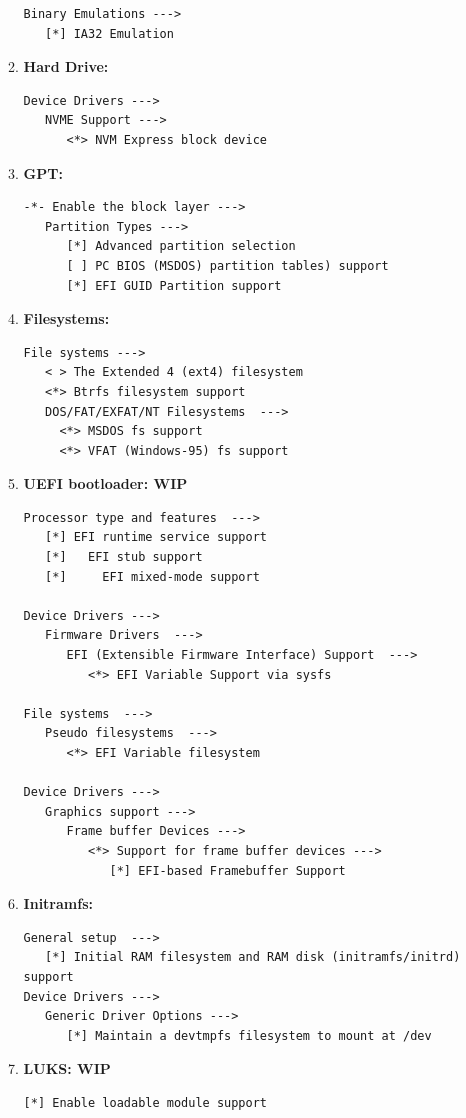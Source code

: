 \documentclass[10pt, a4paper, onecolumn, oneside, titlepage, openany]{book}
\begin{document}
\begin{enumerate}
\begin{enumerate}
\begin{Verbatim}[commandchars=\\\{\}]
Binary Emulations --->
   [*] IA32 Emulation
\end{Verbatim}
        \item \textbf{Hard Drive:}
\begin{Verbatim}[commandchars=\\\{\}]
Device Drivers --->
   NVME Support --->
      <*> NVM Express block device
\end{Verbatim}
    \item \textbf{GPT:}
\begin{Verbatim}[commandchars=\\\{\}]
-*- Enable the block layer --->
   Partition Types --->
      [*] Advanced partition selection
      [ ] PC BIOS (MSDOS) partition tables) support
      [*] EFI GUID Partition support
\end{Verbatim}
        \item \textbf{Filesystems:}
\begin{Verbatim}[commandchars=\\\{\}]
File systems --->
   < > The Extended 4 (ext4) filesystem
   <*> Btrfs filesystem support
   DOS/FAT/EXFAT/NT Filesystems  --->
     <*> MSDOS fs support
     <*> VFAT (Windows-95) fs support
\end{Verbatim}
        \item \textbf{UEFI bootloader: WIP}
\begin{Verbatim}[commandchars=\\\{\}]
Processor type and features  --->
   [*] EFI runtime service support
   [*]   EFI stub support
   [*]     EFI mixed-mode support

Device Drivers --->
   Firmware Drivers  --->
      EFI (Extensible Firmware Interface) Support  --->
         <*> EFI Variable Support via sysfs

File systems  --->
   Pseudo filesystems  --->
      <*> EFI Variable filesystem

Device Drivers --->
   Graphics support --->
      Frame buffer Devices --->
         <*> Support for frame buffer devices --->
            [*] EFI-based Framebuffer Support
\end{Verbatim}
        \item \textbf{Initramfs:}
\begin{Verbatim}[commandchars=\\\{\}]
General setup  --->
   [*] Initial RAM filesystem and RAM disk (initramfs/initrd) support
Device Drivers --->
   Generic Driver Options --->
      [*] Maintain a devtmpfs filesystem to mount at /dev
\end{Verbatim}
        \item \textbf{LUKS: WIP}
\begin{Verbatim}[commandchars=\\\{\}]
[*] Enable loadable module support


\end{Verbatim}
\end{enumerate}
\end{enumerate}
\end{document}
